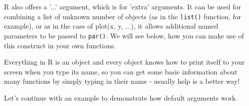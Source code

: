 \documentclass[titlepage]{book}\usepackage{knitr}
\begin{document}
R also offers a '...' argument, which is for 'extra' arguments.  It can be used for combining a list of unknown number of objects (as in the \texttt{list()} function, for example), or as in the case of plot(x, y, ...), it allows additional named parameters to be passed to \texttt{par()}. We will see below, how you can make use of this construct in your own functions.

Everything in R is an object and every object knows how to print itself to your screen when you type its name, so you can get some basic information about many functions by simply typing in their name - usually help is a better way!

Let's continue with an example to demonstrate how default arguments work.


\begin{knitrout}
\color{fgcolor}\begin{kframe}
\begin{alltt}
 \hlkwb{<-} \hlstd{(} \hlstd{=} \hlstd{(}\hlstd{,} \hlstd{,} \hlstd{),}  \hlstd{=} \hlstd{(}\hlstd{,} \hlstd{,} \hlstd{),}  \hlstd{=} \hlstd{(}\hlstd{,} \hlstd{,} \hlstd{))\{}
    \hlkwb{<-}  \hlopt{==}  \hlopt{&}  \hlopt{==} 
 \hlstd{\}}
 \hlkwb{<-} \hlstd{(}\hlstd{,} \hlstd{,} \hlstd{)}
 \hlkwb{<-} \hlstd{(}\hlstd{,} \hlstd{,} \hlstd{)}
 \hlkwb{<-} \hlstd{(}\hlstd{,} \hlstd{,} \hlstd{)}
\hlstd{(}                                           
                                                  
\hlstd{()}                                                        
\hlstd{(}                                                   
                                                
\end{alltt}
\end{kframe}
\end{knitrout}
\end{document}
